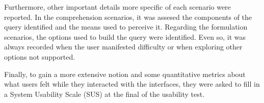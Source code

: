 Furthermore, other important details more specific of each scenario were reported. In the comprehension scenarios, it was assesed the components of the query identified and the means used to perceive it. Regarding the formulation scenarios, the options used to build the query were identified. Even so, it was always recorded when the user manifested difficulty or when exploring other options not supported.

Finally, to gain a more extensive notion and some quantitative metrics about what users felt while they interacted with the interfaces, they were asked to fill in a System Usability Scale (SUS) \cite{system_usability_scale} at the final of the usability test.